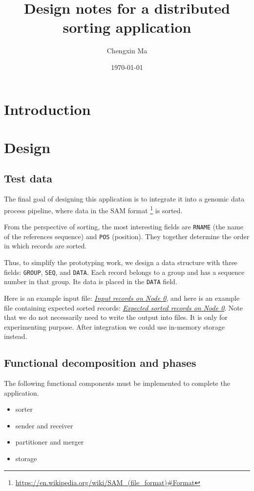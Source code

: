 \documentclass{article}
\title{Design notes for a distributed sorting application}
\author{Chengxin Ma}
\date{\today}
\begin{document}
\maketitle

\section{Introduction}

\section{Design}
\subsection{Test data}
The final goal of designing this application is to integrate it into a genomic data process pipeline, where data in the SAM format
\footnote{\url{https://en.wikipedia.org/wiki/SAM_(file_format)\#Format}} is sorted.

From the perspective of sorting, the most interesting fields are \texttt{RNAME} (the name of the references sequence) and \texttt{POS} (position).
They together determine the order in which records are sorted.

Thus, to simplify the prototyping work, we design a data structure with three fields: \texttt{GROUP}, \texttt{SEQ}, and \texttt{DATA}.
Each record belongs to a group and has a sequence number in that group.
Its data is placed in the \texttt{DATA} field.

Here is an example input file: \href{https://github.com/MaChengxin/playground/blob/master/arrow/flight/my_flight/data/4_nodes/records_on_node_0.txt}{\textit{Input records on Node 0}},
and here is an example file containing expected sorted records: \href{https://github.com/MaChengxin/playground/blob/master/arrow/flight/my_flight/data/4_nodes/expected_records_on_node_0.txt}{\textit{Expected sorted records on Node 0}}.
Note that we do not necessarily need to write the output into files.
It is only for experimenting purpose.
After integration we could use in-memory storage instead.

\subsection{Functional decomposition and phases}

The following functional components must be implemented to complete the application.
\begin{itemize}
    \item sorter
    \item sender and receiver
    \item partitioner and merger
    \item storage
\end{itemize}
\end{document}
